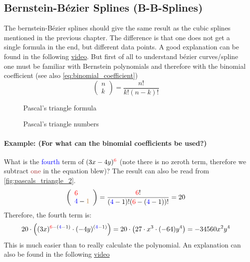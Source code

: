 \subsection{Bernstein-Bézier Splines (B-B-Splines)}
The bernstein-Bézier splines should give the same result as the cubic splines mentioned in the previous chapter. The difference is that one does not get a single formula in the end, but different data points. A good explanation can be found in the following \href{https://youtu.be/aVwxzDHniEw}{video}. But first of all to understand bézier curves/spline one must be familiar with Bernstein polynomials and therefore with the binomial coefficient (see also \autoref{eq:binomial_coefficient})
\begin{equation}\label{eq:binomial_coefficient}
\left(\begin{array}{l}
n \\
k
\end{array}\right)=\frac{n !}{k !(n-k) !}
\end{equation}
\begin{figure}[ht]
  \centering
  \caption{Pascal's triangle formula}
  \label{fig:pascals_triangle}
\end{figure}
\begin{figure}[ht]
  \centering
  \caption{Pascal's triangle numbers}
  \label{fig:pascals_triangle_2}
\end{figure}\newline
\paragraph{Example: (For what can the binomial coefficients be used?)}
What is the \textcolor{blue}{fourth} term of $(3x-4y)^{\textcolor{red}{6}}$ (note there is no zeroth term, therefore we subtract \textcolor{brown}{one} in the equation blew)? The result can also be read from \autoref{fig:pascals_triangle_2}.
$$
\left(\begin{array}{l}
\textcolor{red}{6} \\
\textcolor{blue}{4}-\textcolor{brown}{1}
\end{array}\right)=\frac{\textcolor{red}{6} !}{(\textcolor{blue}{4}-1) !(\textcolor{red}{6}-(\textcolor{blue}{4}-1)) !} = 20
$$
Therefore, the fourth term is:
$$
20 \cdot \left( (3x)^{\textcolor{red}{6}-(\textcolor{blue}{4}-1)}\cdot(-4y)^{(\textcolor{blue}{4}-1)}\right)=20 \cdot \left(27 \cdot x^3 \cdot (-64)y^4\right)=-34560x^2y^4
$$
This is much easier than to really calculate the polynomial. An explanation can also be found in the following \href{https://youtu.be/s19dWIHficY}{video}



